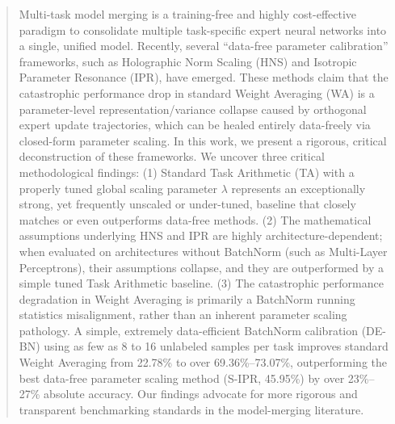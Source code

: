 \documentclass{article}
\begin{document}

\printAffiliationsAndNotice{}

\begin{abstract}
  Multi-task model merging is a training-free and highly cost-effective paradigm to consolidate multiple task-specific expert neural networks into a single, unified model. Recently, several ``data-free parameter calibration'' frameworks, such as Holographic Norm Scaling (HNS) and Isotropic Parameter Resonance (IPR), have emerged. These methods claim that the catastrophic performance drop in standard Weight Averaging (WA) is a parameter-level representation/variance collapse caused by orthogonal expert update trajectories, which can be healed entirely data-freely via closed-form parameter scaling. In this work, we present a rigorous, critical deconstruction of these frameworks. We uncover three critical methodological findings: (1) Standard Task Arithmetic (TA) with a properly tuned global scaling parameter $\lambda$ represents an exceptionally strong, yet frequently unscaled or under-tuned, baseline that closely matches or even outperforms data-free methods. (2) The mathematical assumptions underlying HNS and IPR are highly architecture-dependent; when evaluated on architectures without BatchNorm (such as Multi-Layer Perceptrons), their assumptions collapse, and they are outperformed by a simple tuned Task Arithmetic baseline. (3) The catastrophic performance degradation in Weight Averaging is primarily a BatchNorm running statistics misalignment, rather than an inherent parameter scaling pathology. A simple, extremely data-efficient BatchNorm calibration (DE-BN) using as few as 8 to 16 unlabeled samples per task improves standard Weight Averaging from 22.78\% to over 69.36\%--73.07\%, outperforming the best data-free parameter scaling method (S-IPR, 45.95\%) by over 23\%--27\% absolute accuracy. Our findings advocate for more rigorous and transparent benchmarking standards in the model-merging literature.
\end{abstract}
\end{document}
